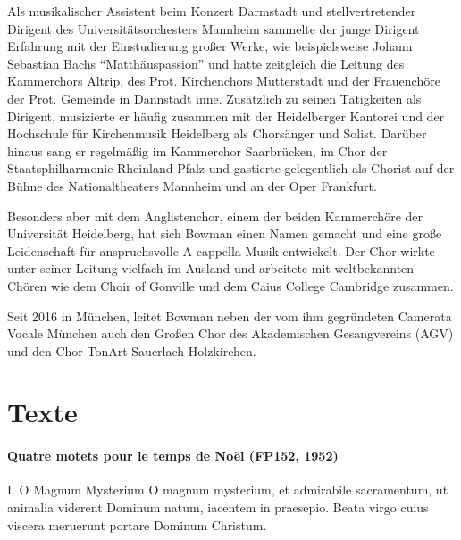 \documentclass[11pt, ngermanm, titlepage]{article}
\begin{document}
\begin{multicols}{2}
	Als musikalischer Assistent beim Konzert Darmstadt und stellvertretender Dirigent des Universitätsorchesters Mannheim sammelte der junge Dirigent Erfahrung mit der Einstudierung großer Werke, wie beispielsweise Johann Sebastian Bachs "`Matthäuspassion"' und hatte zeitgleich die Leitung des Kammerchors Altrip, des Prot. Kirchenchors Mutterstadt und der Frauenchöre der Prot. Gemeinde in Dannstadt inne. Zusätzlich zu seinen Tätigkeiten als Dirigent, musizierte er häufig zusammen mit der Heidelberger Kantorei und der Hochschule für Kirchenmusik Heidelberg als Chorsänger und Solist. Darüber hinaus sang er regelmäßig im Kammerchor Saarbrücken, im Chor der Staatsphilharmonie Rheinland-Pfalz und gastierte gelegentlich als Chorist auf der Bühne des Nationaltheaters Mannheim und an der Oper Frankfurt.
	 
	Besonders aber mit dem Anglistenchor, einem der beiden Kammerchöre der Universität Heidelberg, hat sich Bowman einen Namen gemacht und eine große Leidenschaft für anspruchsvolle A-cappella-Musik entwickelt. Der Chor wirkte unter seiner Leitung vielfach im Ausland und arbeitete mit weltbekannten Chören wie dem Choir of Gonville und dem Caius College Cambridge zusammen.
	 
	Seit 2016 in München, leitet Bowman neben der vom ihm gegründeten Camerata Vocale München auch den Großen Chor des Akademischen Gesangvereins (AGV) und den Chor TonArt Sauerlach-Holzkirchen.
	
	\section*{Texte}
	
	\paragraph{Quatre motets pour le temps de Noël (FP152, 1952)\newline}
	
	I. O Magnum Mysterium\newline
	O magnum mysterium,\newline
	et admirabile sacramentum,\newline
	ut animalia viderent Dominum natum,\newline
	iacentem in praesepio.\newline
	Beata virgo cuius viscera meruerunt\newline
	portare Dominum Christum.\newline
	

\end{multicols}
\end{document}
